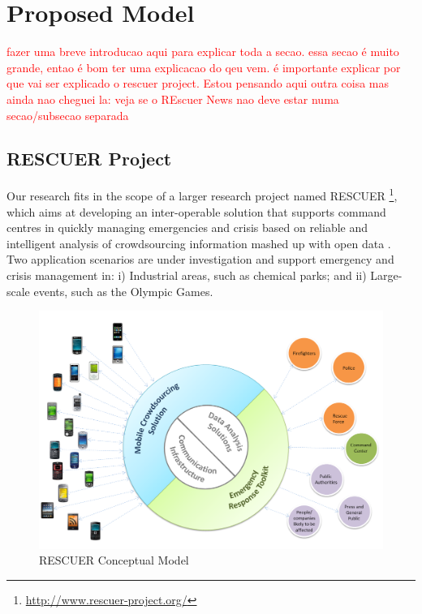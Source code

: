 \section{Proposed Model}\label{sec:proposedModel}
\textcolor{red}{fazer uma breve introducao aqui para explicar toda a secao. essa secao é muito grande, entao é bom ter uma explicacao do qeu vem. é importante explicar por que vai ser explicado o rescuer project. Estou pensando aqui outra coisa mas ainda nao cheguei la: veja se o REscuer News nao deve estar numa secao/subsecao separada}

\subsection{RESCUER Project}

Our research fits in the scope of a larger research project named RESCUER \footnote{\url{http://www.rescuer-project.org/}}, which aims at developing an inter-operable solution that supports command centres in quickly managing emergencies and crisis based on reliable and intelligent analysis of crowdsourcing information mashed up with open data \citep{villela2014smart}\citep{villela2018}. Two application scenarios are under investigation and support emergency and crisis management in: i) Industrial areas, such as chemical parks; and ii) Large-scale events, such as the Olympic Games.

\begin{figure}[ht!]
\begin{center}
  \includegraphics[width=0.98\linewidth, keepaspectratio]{images/rescuerConcept.PNG}
\caption{RESCUER Conceptual Model}
\label{fig:rescuerConcept}
\end{center}
\end{figure}

